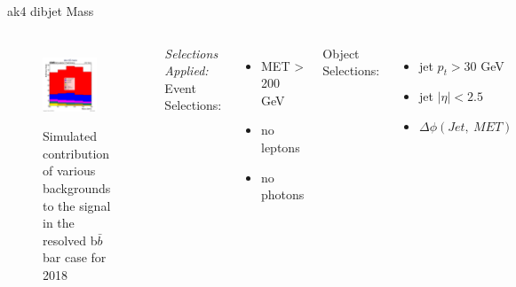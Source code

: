 \documentclass[10pt,xcolor=dvipsnames,aspectratio=169]{beamer}
\begin{document}


     \begin{frame}[fragile]{ak4 dibjet Mass}
      \begin{columns}
        \begin{figure}
          \centering
          \includegraphics[width=0.8\textwidth]{../Backgrounds/plots/SR_Resolved_Backgrounds_dijet_mass_Combined.png}
          \label{contribution}
          \caption{Simulated contribution of various backgrounds to the signal in the resolved b$ \bar{b} $ bar case for 2018}
        \end{figure}
        \textit{Selections Applied:} \\
        Event Selections:
        \begin{itemize}
          \raggedright 
          \tiny
          \item {MET > 200 GeV}
          \item {no leptons}
          \item {no photons}
        \end{itemize}
        Object Selections:
        \begin{itemize}
          \raggedright 
          \tiny
          \item {jet $p_t > 30 $ GeV}
          \item {jet $| \eta | < 2.5 $}
          \item {$\Delta \phi (Jet, \ MET)$}

\end{itemize}
\end{columns}
\end{frame}
\end{document}
